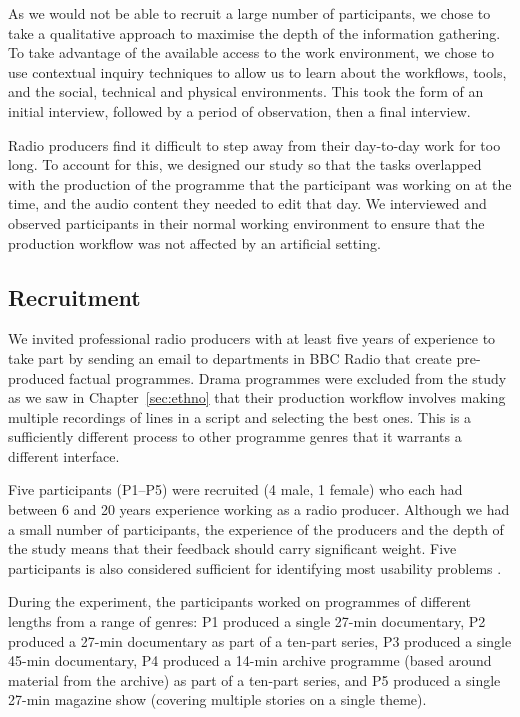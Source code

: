 As we would not be able to recruit a large number of participants, we chose to take a qualitative approach to maximise
the depth of the information gathering. To take advantage of the available access to the work environment, we chose to
use contextual inquiry techniques to allow us to learn about the workflows, tools, and the social, technical and
physical environments. This took the form of an initial interview, followed by a period of observation, then a final
interview.

Radio producers find it difficult to step away from their day-to-day work for too long.  To account for this, we
designed our study so that the tasks overlapped with
the production of the programme that the participant was working on at the time, and the audio
content they needed to edit that day. We interviewed and observed participants in their normal working environment to
ensure that the production workflow was not affected by an artificial setting.

\subsection{Recruitment}

We invited professional radio producers with at least five years of experience to take part by sending an email to
departments in BBC Radio that create pre-produced factual programmes.  Drama programmes were excluded from the study as
we saw in Chapter~\ref{sec:ethno} that their production workflow involves making multiple recordings of lines in a
script and selecting the best ones. This is a sufficiently different process to other programme genres that it warrants
a different interface.

Five participants (P1--P5) were recruited (4 male, 1 female) who each had between 6 and 20 years experience working
as a radio producer. Although we had a small number of participants, the experience of the producers and the depth of
the study means that their feedback should carry significant weight. Five participants is also considered sufficient
for identifying most usability problems \citep{Nielsen1993}.

During the experiment, the participants worked on programmes of different
lengths from a range of genres:
P1 produced a single 27-min documentary, %
P2 produced a 27-min documentary as part of a ten-part series,
P3 produced a single 45-min documentary,
P4 produced a 14-min archive programme
(based around material from the archive) as part of a ten-part series, and
P5 produced a single 27-min magazine show (covering multiple stories on a
single theme).

